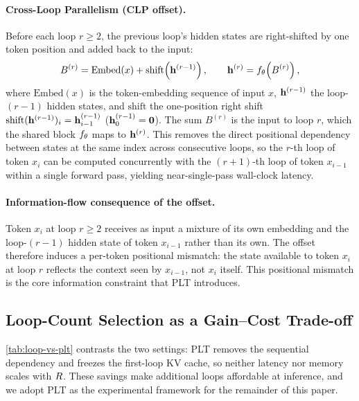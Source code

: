 \paragraph{Cross-Loop Parallelism (CLP offset).}
Before each loop $r \geq 2$, the previous loop's hidden states are
right-shifted by one token position and added back to the input:
\begin{equation}
  B^{(r)} = \mathrm{Embed}(x) + \mathrm{shift}\!\left(\mathbf{h}^{(r-1)}\right),
  \qquad
  \mathbf{h}^{(r)} = f_\theta\!\left(B^{(r)}\right),
  \label{eq:clp}
\end{equation}
where $\mathrm{Embed}(x)$ is the token-embedding sequence of input $x$,
$\mathbf{h}^{(r-1)}$ the loop-$(r-1)$ hidden states, and $\mathrm{shift}$ the
one-position right shift $\mathrm{shift}(\mathbf{h}^{(r-1)})_i=\mathbf{h}^{(r-1)}_{i-1}$
($\mathbf{h}^{(r-1)}_{0}=\mathbf{0}$). The sum $B^{(r)}$ is the input to loop $r$,
which the shared block $f_\theta$ maps to $\mathbf{h}^{(r)}$.
This removes the direct positional dependency between states at the same
index across consecutive loops, so the $r$-th loop of token $x_i$ can be
computed concurrently with the $(r+1)$-th loop of token $x_{i-1}$ within a
single forward pass, yielding near-single-pass wall-clock latency.

\paragraph{Information-flow consequence of the offset.}
Token $x_i$ at loop $r \geq 2$ receives as input a mixture of its own
embedding and the loop-$(r-1)$ hidden state of token $x_{i-1}$ rather
than its own.
The offset therefore induces a per-token positional mismatch: the state
available to token $x_i$ at loop $r$ reflects the context seen by
$x_{i-1}$, not $x_i$ itself.
This positional mismatch is the core information constraint that PLT introduces.

\subsection{Loop-Count Selection as a Gain--Cost Trade-off}
\label{sec:gaincost}

\autoref{tab:loop-vs-plt} contrasts the two settings: PLT removes the sequential
dependency and freezes the first-loop KV cache, so neither latency nor memory
scales with $R$.
These savings make additional loops affordable at inference, and we adopt PLT as
the experimental framework for the remainder of this paper.

